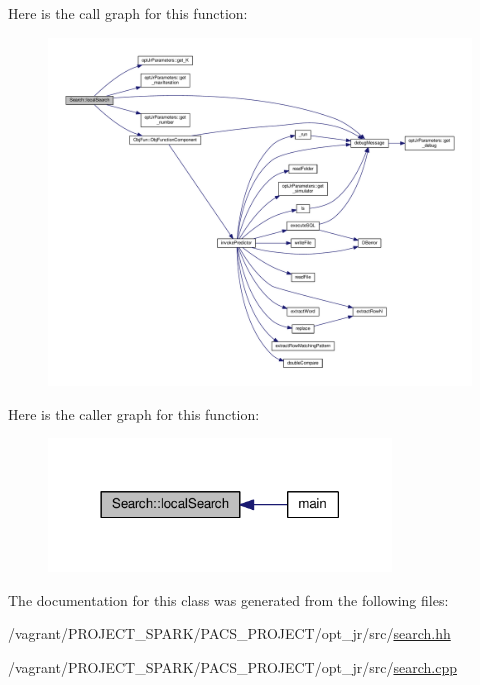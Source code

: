 Here is the call graph for this function\-:\nopagebreak
\begin{figure}[H]
\begin{center}
\leavevmode
\includegraphics[width=350pt]{classSearch_af95c649fd7dba70b7bd3c124ec501046_cgraph}
\end{center}
\end{figure}




Here is the caller graph for this function\-:\nopagebreak
\begin{figure}[H]
\begin{center}
\leavevmode
\includegraphics[width=258pt]{classSearch_af95c649fd7dba70b7bd3c124ec501046_icgraph}
\end{center}
\end{figure}




The documentation for this class was generated from the following files\-:\begin{DoxyCompactItemize}
\item 
/vagrant/\-P\-R\-O\-J\-E\-C\-T\-\_\-\-S\-P\-A\-R\-K/\-P\-A\-C\-S\-\_\-\-P\-R\-O\-J\-E\-C\-T/opt\-\_\-jr/src/\hyperlink{search_8hh}{search.\-hh}\item 
/vagrant/\-P\-R\-O\-J\-E\-C\-T\-\_\-\-S\-P\-A\-R\-K/\-P\-A\-C\-S\-\_\-\-P\-R\-O\-J\-E\-C\-T/opt\-\_\-jr/src/\hyperlink{search_8cpp}{search.\-cpp}\end{DoxyCompactItemize}
